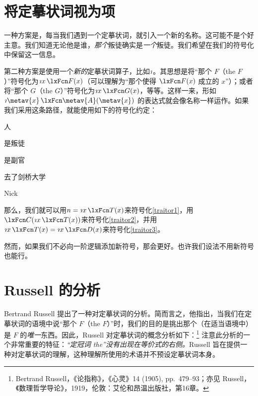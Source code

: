 \section{将定摹状词视为项}
一种方案是，每当我们遇到一个定摹状词，就引入一个新的名称。这可能不是个好主意。我们知道无论他是谁，\emph{那个}叛徒确实是\emph{一个}叛徒。我们希望在我们的符号化中保留这一信息。

第二种方案是使用一个\emph{新的}定摹状词算子，比如$\maththe$。其思想是将“那个 $F$（the $F$）”符号化为$\maththe x\,\atom{F}{x}$（可以理解为“那个使得 $\atom{F}{x}$ 成立的 $x$”）；或者将“那个 $G$（the $G$）”符号化为$\maththe x\,\atom{G}{x}$，等等。这样一来，形如 $\maththe \metav{x}\, \atom{\metav{A}}{\metav{x}}$ 的表达式就会像名称一样运作。如果我们采用这条路径，就能使用如下的符号化约定：
	\begin{ekey}
		\item[\text{论域}] 人
		\item[\atom{T}{x}]  是叛徒
		\item[\atom{D}{x}]  是副官
		\item[\atom{C}{x}]  去了剑桥大学
		\item[n] Nick
	\end{ekey}
那么，我们就可以用$n = \maththe x\, \atom{T}{x}$来符号化\cref{traitor1}，用$\atom{C}{\maththe x\,\atom{T}{x}}$来符号化\cref{traitor2}，并用$\maththe x\, \atom{T}{x} = \maththe x\, \atom{D}{x}$来符号化\cref{traitor3}。

然而，如果我们不必向一阶逻辑添加新符号，那会更好。也许我们设法不用新符号也能行。

\section{Russell 的分析}
Bertrand Russell 提出了一种对定摹状词的分析。简而言之，他指出，当我们在定摹状词的语境中说“那个 $F$（the $F$）”时，我们的目的是挑出那个（在适当语境中）是 $F$ 的\emph{唯一}东西。因此，Russell 对定摹状词的概念分析如下：\footnote{Bertrand Russell，《论指称》，《心灵》14 (1905), pp.\ 479--93；亦见 Russell，《数理哲学导论》，1919，伦敦：艾伦和昂温出版社，第16章。}
注意此分析的一个非常重要的特征：\emph{“定冠词 the”没有出现在等价式的右侧。}Russell 旨在提供一种对定摹状词的理解，这种理解所使用的术语并不预设定摹状词本身。

